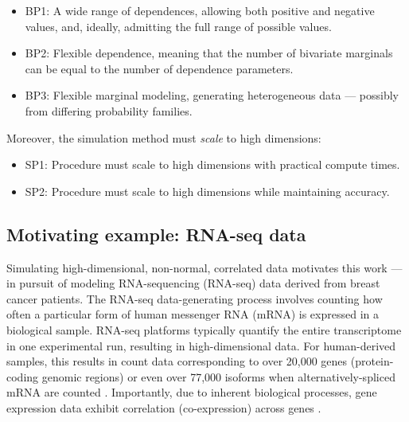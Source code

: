 \documentclass[
]{jss}
\providecommand{\tightlist}{%
  \setlength{\itemsep}{0pt}\setlength{\parskip}{0pt}}
\begin{document}

\begin{itemize}
\tightlist
\item
  BP1: A wide range of dependences, allowing both positive and negative values, and, ideally, admitting the full range of possible values.
\item
  BP2: Flexible dependence, meaning that the number of bivariate marginals can be equal to the number of dependence parameters.
\item
  BP3: Flexible marginal modeling, generating heterogeneous data --- possibly from differing probability families.
\end{itemize}


Moreover, the simulation method must \emph{scale} to high dimensions:


\begin{itemize}
\tightlist
\item
  SP1: Procedure must scale to high dimensions with practical compute times.
\item
  SP2: Procedure must scale to high dimensions while maintaining accuracy.
\end{itemize}


\hypertarget{motivating-example-rna-seq-data}{%
\subsection{Motivating example: RNA-seq data}\label{motivating-example-rna-seq-data}}

Simulating high-dimensional, non-normal, correlated data motivates this work --- in pursuit of modeling RNA-sequencing (RNA-seq) data \citep{Wang2009b, Conesa2016b} derived from breast cancer patients. The RNA-seq data-generating process involves counting how often a particular form of human messenger RNA (mRNA) is expressed in a biological sample. RNA-seq platforms typically quantify the entire transcriptome in one experimental run, resulting in high-dimensional data. For human-derived samples, this results in count data corresponding to over 20,000 genes (protein-coding genomic regions) or even over 77,000 isoforms when alternatively-spliced mRNA are counted \citep{Schissler2019}. Importantly, due to inherent biological processes, gene expression data exhibit correlation (co-expression) across genes \citep{BE07, Schissler2018}.
\end{document}
